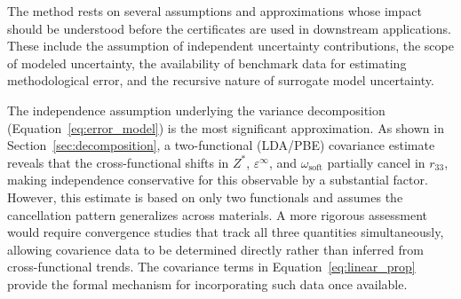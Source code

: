 \documentclass[prb,twocolumn,superscriptaddress,amsmath,amssymb,longbibliography]{revtex4-2}
\begin{document}



The method rests on several assumptions and approximations whose impact should be 
understood before the certificates are used in downstream applications. 
These include the assumption of independent uncertainty contributions, the scope of modeled 
uncertainty, the availability of benchmark data for estimating methodological error, and the recursive nature 
of surrogate model uncertainty.

The independence assumption underlying the variance decomposition 
(Equation~\ref{eq:error_model}) is the most significant approximation. As shown 
in Section~\ref{sec:decomposition}, a two-functional (LDA/PBE) covariance 
estimate reveals that the cross-functional shifts in $Z^*$, 
$\varepsilon^\infty$, and $\omega_{\mathrm{soft}}$ partially cancel in 
$r_{33}$, making independence conservative for this observable by a 
substantial factor. However, this estimate is based on only two functionals 
and assumes the cancellation pattern generalizes across materials. A more rigorous assessment would require convergence studies that track all three quantities simultaneously, allowing covarience data to be determined directly rather than inferred from cross-functional trends. 
 The covariance terms in 
Equation~\ref{eq:linear_prop} provide the formal mechanism for incorporating 
such data once available.
\end{document}
